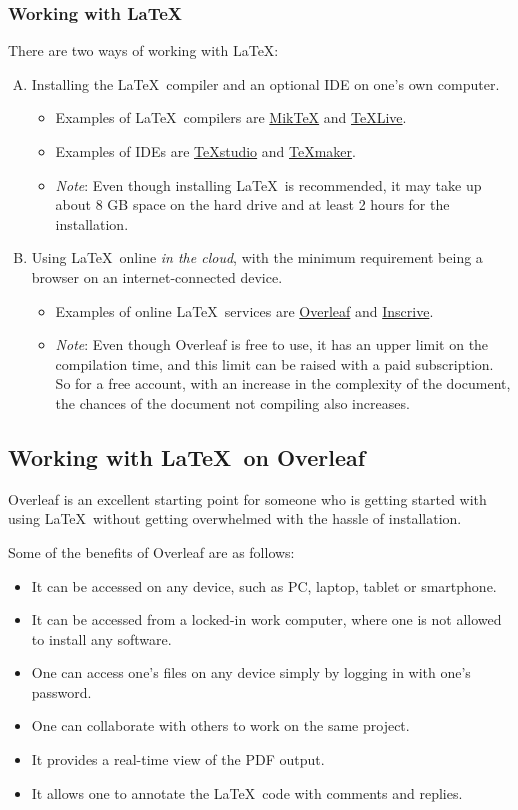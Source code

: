 		\subsubsection{Working with \LaTeX}
			There are two ways of working with \LaTeX:
			\begin{enumerate}[A.]
				\item Installing the \LaTeX\ compiler and an optional IDE on one's own computer.
				\begin{itemize}
					\item Examples of \LaTeX\ compilers are \href{https://miktex.org/}{MikTeX} and \href{https://www.tug.org/texlive/}{TeXLive}.
					\item Examples of IDEs are \href{https://www.texstudio.org/}{TeXstudio} and \href{https://www.xm1math.net/texmaker/}{TeXmaker}.
					\item \emph{Note}: Even though installing \LaTeX\ is recommended, it may take up about 8 GB space on the hard drive and at least 2 hours for the installation.
				\end{itemize}
				
				\item Using \LaTeX\ online \emph{in the cloud}, with the minimum requirement being a browser on an internet-connected device.
				\begin{itemize}
					\item Examples of online \LaTeX\ services are \href{https://www.overleaf.com}{Overleaf} and \href{https://app.inscrive.io}{Inscrive}.
					\item \emph{Note}: Even though Overleaf is free to use, it has an upper limit on the compilation time, and this limit can be raised with a paid subscription. So for a free account, with an increase in the complexity of the document, the chances of the document not compiling also increases.
				\end{itemize}
			\end{enumerate}
			
	\subsection{Working with \LaTeX\ on Overleaf}
		Overleaf is an excellent starting point for someone who is getting started with using \LaTeX\ without getting overwhelmed with the hassle of installation.
		
		Some of the benefits of Overleaf are as follows:
		\begin{itemize}
			\item It can be accessed on any device, such as PC, laptop, tablet or smartphone.
			\item It can be accessed from a locked-in work computer, where one is not allowed to install any software.
			\item One can access one's files on any device simply by logging in with one's password.
			\item One can collaborate with others to work on the same project.
			\item It provides a real-time view of the PDF output.
			\item It allows one to annotate the \LaTeX\ code with comments and replies.
		\end{itemize}
		

